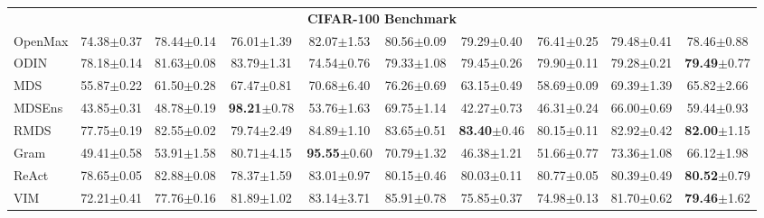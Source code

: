 \begin{table}[ht]
\begin{center}
{\begin{tabular}{lccccccccc}
\midrule
\multicolumn{10}{c}{\textbf{CIFAR-100 Benchmark}} \\
OpenMax & 74.38\scriptsize{$\pm$0.37} & 78.44\scriptsize{$\pm$0.14} & 76.01\scriptsize{$\pm$1.39} & 82.07\scriptsize{$\pm$1.53} & 80.56\scriptsize{$\pm$0.09} & 79.29\scriptsize{$\pm$0.40} & 76.41\scriptsize{$\pm$0.25} & 79.48\scriptsize{$\pm$0.41} & 78.46\scriptsize{$\pm$0.88}\\
ODIN & 78.18\scriptsize{$\pm$0.14} & 81.63\scriptsize{$\pm$0.08} & 83.79\scriptsize{$\pm$1.31} & 74.54\scriptsize{$\pm$0.76} & 79.33\scriptsize{$\pm$1.08} & 79.45\scriptsize{$\pm$0.26} & 79.90\scriptsize{$\pm$0.11} & 79.28\scriptsize{$\pm$0.21} & \textbf{79.49}\scriptsize{$\pm$0.77}\\
MDS & 55.87\scriptsize{$\pm$0.22} & 61.50\scriptsize{$\pm$0.28} & 67.47\scriptsize{$\pm$0.81} & 70.68\scriptsize{$\pm$6.40} & 76.26\scriptsize{$\pm$0.69} & 63.15\scriptsize{$\pm$0.49} & 58.69\scriptsize{$\pm$0.09} & 69.39\scriptsize{$\pm$1.39} & 65.82\scriptsize{$\pm$2.66}\\
MDSEns & 43.85\scriptsize{$\pm$0.31} & 48.78\scriptsize{$\pm$0.19} & \textbf{98.21}\scriptsize{$\pm$0.78} & 53.76\scriptsize{$\pm$1.63} & 69.75\scriptsize{$\pm$1.14} & 42.27\scriptsize{$\pm$0.73} & 46.31\scriptsize{$\pm$0.24} & 66.00\scriptsize{$\pm$0.69} & 59.44\scriptsize{$\pm$0.93}\\
RMDS & 77.75\scriptsize{$\pm$0.19} & 82.55\scriptsize{$\pm$0.02} & 79.74\scriptsize{$\pm$2.49} & 84.89\scriptsize{$\pm$1.10} & 83.65\scriptsize{$\pm$0.51} & \textbf{83.40}\scriptsize{$\pm$0.46} & 80.15\scriptsize{$\pm$0.11} & 82.92\scriptsize{$\pm$0.42} & \textbf{82.00}\scriptsize{$\pm$1.15}\\
Gram & 49.41\scriptsize{$\pm$0.58} & 53.91\scriptsize{$\pm$1.58} & 80.71\scriptsize{$\pm$4.15} & \textbf{95.55}\scriptsize{$\pm$0.60} & 70.79\scriptsize{$\pm$1.32} & 46.38\scriptsize{$\pm$1.21} & 51.66\scriptsize{$\pm$0.77} & 73.36\scriptsize{$\pm$1.08} & 66.12\scriptsize{$\pm$1.98}\\
ReAct & 78.65\scriptsize{$\pm$0.05} & 82.88\scriptsize{$\pm$0.08} & 78.37\scriptsize{$\pm$1.59} & 83.01\scriptsize{$\pm$0.97} & 80.15\scriptsize{$\pm$0.46} & 80.03\scriptsize{$\pm$0.11} & 80.77\scriptsize{$\pm$0.05} & 80.39\scriptsize{$\pm$0.49} & \textbf{80.52}\scriptsize{$\pm$0.79}\\
VIM & 72.21\scriptsize{$\pm$0.41} & 77.76\scriptsize{$\pm$0.16} & 81.89\scriptsize{$\pm$1.02} & 83.14\scriptsize{$\pm$3.71} & 85.91\scriptsize{$\pm$0.78} & 75.85\scriptsize{$\pm$0.37} & 74.98\scriptsize{$\pm$0.13} & 81.70\scriptsize{$\pm$0.62} & \textbf{79.46}\scriptsize{$\pm$1.62}\\

\end{tabular}}
\end{center}
\end{table}
